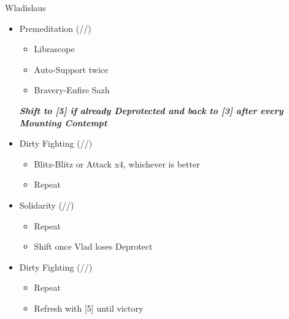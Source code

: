 \renewcommand{\first}{[1] Cerberus (\com/\com/\com)}
\renewcommand{\second}{[2] Cerberus (\com/\com/\com)}
\renewcommand{\third}{[3] Dirty Fighting (\com/\sab/\sen)}
\renewcommand{\fourth}{[4] Premeditation (\syn/\sab/\sen)}
\renewcommand{\fifth}{[5] Solidarity (\com/\med/\sen)}
\renewcommand{\sixth}{[6] Tri-Disaster (\rav/\rav/\rav)}

\begin{battle}{Wladislaus}
	\begin{itemize}
		\item \fourth
			\begin{itemize}
				\item Librascope
				\item Auto-Support twice
				\item Bravery-Enfire Sazh
			\end{itemize}
		\textit{\textbf{Shift to [5] if already Deprotected and back to [3] after every Mounting Contempt}}
		\item \third
			\begin{itemize}
				\item Blitz-Blitz or Attack x4, whichever is better
				\item Repeat			
			\end{itemize}
		\item \fifth
			\begin{itemize}
				\item Repeat
				\item Shift once Vlad loses Deprotect
			\end{itemize}
		\item \third
			\begin{itemize}
				\item Repeat
				\item Refresh with [5] until victory
			\end{itemize}
	\end{itemize}
\end{battle}

